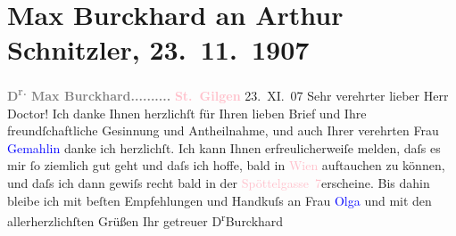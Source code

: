 

               \section[Max Burckhard an Arthur Schnitzler, 23. 11. 1907]{ Max Burckhard an Arthur Schnitzler, 23. 11. 1907}\nopagebreak{}\rehead{ }\normalsize\beginnumbering{} \toendnotes[C]{\smallbreak\pagebreak[2]} 
\toendnotes[C]{\smallbreak}\pstart
           \noindent{}{\pb}\textcolor{gray}{\textbf{D\textsuperscript{r.} Max Burckhard}}\hfill \textcolor{gray}{\textbf{\strikeout{\textcolor{pink}{Wien, IX. Porzellangasse 48}{}\ledrightnote{\textcolor{pink}{Porzellangasse}}}{ }..........}}\pend
           \pstart
           \raggedleft{}\textcolor{gray}{\textbf{\textcolor{pink}{St. Gilgen}{}\ledrightnote{\textcolor{pink}{St. Gilgen}}}}{ }23. XI. 07\pend
           \pstart{}Sehr verehrter lieber Herr Doctor!\pend\pstart
           Ich danke Ihnen herzlichſt für Ihren lieben Brief und Ihre freundſchaftliche
                    Gesinnung und Antheilnahme, und auch Ihrer verehrten Frau \textcolor{blue}{Gemahlin}{} danke ich herzlichſt. Ich kann
                    Ihnen erfreulicherweiſe melden, daſs es mir ſo ziemlich gut geht und daſs ich
                    hoffe, bald in \textcolor{pink}{Wien}{}\ledrightnote{\textcolor{pink}{Wien}} auftauchen zu können, und
                    daſs ich dann gewiſs recht bald in der \textcolor{pink}{Spöttelgasse 7}{}\ledrightnote{\textcolor{pink}{Edmund-Weiß-Gasse}}{ }{\pb}erscheine.\pend
           \pstart
           Bis dahin bleibe ich mit beſten Empfehlungen und Handkuſs an Frau \textcolor{blue}{Olga}{}\ledrightnote{\textcolor{blue}{Olga Schnitzler}} und mit den allerherzlichſten Grüßen Ihr
                    getreuer\pend
           \pstart \spacefill\mbox{D\textsuperscript{r}Burckhard}\pend{}\endnumbering{}  
      